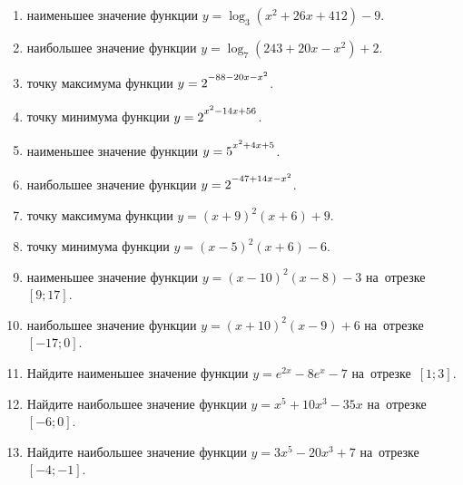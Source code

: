 \documentclass[a4paper,10pt]{article}
\begin{document}
\begin{enumerate}
\item {} наименьшее значение функции $y=\log_3\left(x^2+26x+412\right)-9$.

\item {} наибольшее значение функции $y=\log_7\left(243+20x-x^2\right)+2$.

\item {} точку максимума функции $y=2\strut^{-88-20x-x^2}$.

\item {} точку минимума функции $y=2\strut^{x^2-14x+56}$.

\item {} наименьшее значение функции $y=5\strut^{x^2+4x+5}$.

\item {} наибольшее значение функции $y=2\strut^{-47+14x-x^2}$.

\item {} точку максимума функции $y=\left(x+9\right)^2\left(x+6\right)+9$.

\item {} точку минимума функции $y=\left(x-5\right)^2\left(x+6\right)-6$.

\item {} наименьшее значение функции $y=\left(x-10\right)^2\left(x-8\right)-3$ на~отрезке~$\left[9;17\right]$.

\item {} наибольшее значение функции $y=\left(x+10\right)^2\left(x-9\right)+6$ на~отрезке~$\left[-17;0\right]$.

\item Найдите наименьшее значение функции $y=e^{2x}-8e^x-7$ на~отрезке~$\left[1;3\right]$.

\item Найдите наибольшее значение функции $y=x^5+10x^3-35x$ на~отрезке~$\left[-6;0\right]$.

\item Найдите наибольшее значение функции $y=3x^5-20x^3+7$ на~отрезке~$\left[-4;-1\right]$.

\end{enumerate}
\end{document}
